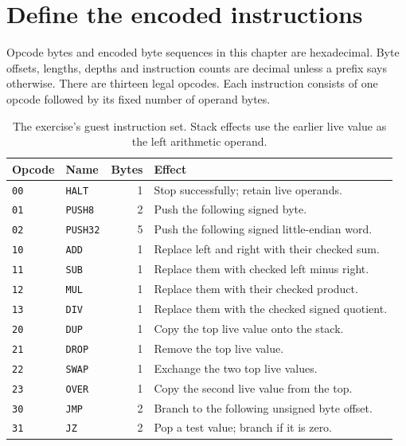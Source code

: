 \section{Define the encoded instructions}\label{vm-opcodes}
Opcode bytes and encoded byte sequences in this chapter are hexadecimal. Byte offsets,
lengths, depths and instruction counts are decimal unless a prefix says otherwise.
There are thirteen legal opcodes. Each instruction consists of one opcode followed
by its fixed number of operand bytes.

\begin{table}[htbp]
  \centering
  \caption{The exercise's guest instruction set. Stack effects use the earlier live value as the left arithmetic operand.}
  \begin{tabular}{llrp{80mm}}
    \toprule
    Opcode      & Name            & Bytes & Effect                                         \\
    \midrule
    \texttt{00} & \texttt{HALT}   & 1     & Stop successfully; retain live operands.       \\
    \texttt{01} & \texttt{PUSH8}  & 2     & Push the following signed byte.                \\
    \texttt{02} & \texttt{PUSH32} & 5     & Push the following signed little-endian word.  \\
    \texttt{10} & \texttt{ADD}    & 1     & Replace left and right with their checked sum. \\
    \texttt{11} & \texttt{SUB}    & 1     & Replace them with checked left minus right.    \\
    \texttt{12} & \texttt{MUL}    & 1     & Replace them with their checked product.       \\
    \texttt{13} & \texttt{DIV}    & 1     & Replace them with the checked signed quotient. \\
    \texttt{20} & \texttt{DUP}    & 1     & Copy the top live value onto the stack.        \\
    \texttt{21} & \texttt{DROP}   & 1     & Remove the top live value.                     \\
    \texttt{22} & \texttt{SWAP}   & 1     & Exchange the two top live values.              \\
    \texttt{23} & \texttt{OVER}   & 1     & Copy the second live value from the top.       \\
    \texttt{30} & \texttt{JMP}    & 2     & Branch to the following unsigned byte offset.  \\
    \texttt{31} & \texttt{JZ}     & 2     & Pop a test value; branch if it is zero.        \\
    \bottomrule
  \end{tabular}
\end{table}

